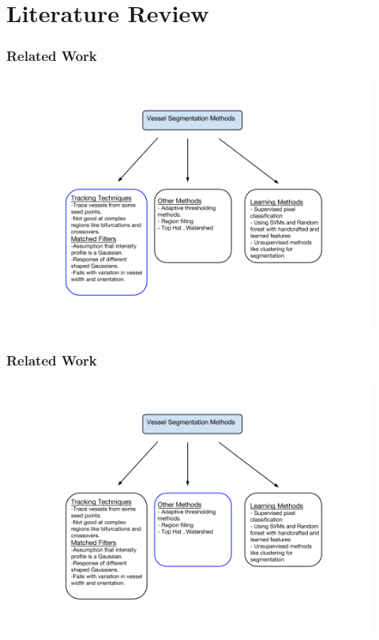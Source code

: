 \documentclass{beamer}
\begin{document}
	\section{Literature Review}
			\begin{frame}
				\frametitle{Related Work}
				\begin{figure}
					\includegraphics[width=0.9\linewidth]{methods/m1.png}%
				\end{figure}
			\end{frame}
			
			\begin{frame}
				\frametitle{Related Work}
				\begin{figure}
					\includegraphics[width=0.9\linewidth]{methods/m2.png}%
				\end{figure}
			\end{frame}
			
\end{document}
